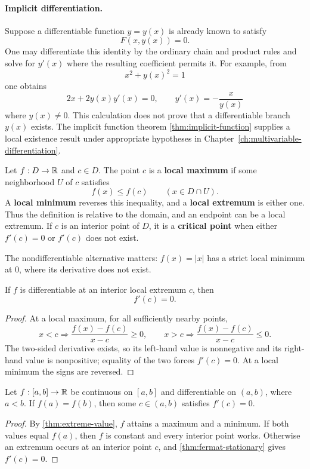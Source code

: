 \paragraph{Implicit differentiation.}
Suppose a differentiable function \(y=y(x)\) is already known to satisfy
\[
F(x,y(x))=0.
\]
One may differentiate this identity by the ordinary chain and product rules
and solve for \(y'(x)\) where the resulting coefficient permits it. For
example, from
\[
x^2+y(x)^2=1
\]
one obtains
\[
2x+2y(x)y'(x)=0,
\qquad
y'(x)=-\frac{x}{y(x)}
\]
where \(y(x)\ne0\). This calculation does not prove that a differentiable
branch \(y(x)\) exists. The implicit function theorem
\cref{thm:implicit-function} supplies a local existence result under
appropriate hypotheses in Chapter~\ref{ch:multivariable-differentiation}.

\begin{definition}
\label{def:local-extrema-critical}
Let \(f:D\to\mathbb{R}\) and \(c\in D\). The point \(c\) is a \textbf{local
maximum} if some neighborhood \(U\) of \(c\) satisfies
\[
f(x)\leq f(c)\qquad(x\in D\cap U).
\]
A \textbf{local minimum} reverses this inequality, and a
\textbf{local extremum} is either one. Thus the definition is relative to
the domain, and an endpoint can be a local extremum. If \(c\) is an interior
point of \(D\), it is a \textbf{critical point} when either \(f'(c)=0\) or
\(f'(c)\) does not exist.
\end{definition}
The nondifferentiable alternative matters: \(f(x)=|x|\) has a strict local
minimum at \(0\), where its derivative does not exist.

\begin{theorem}
\label{thm:fermat-stationary}
If \(f\) is differentiable at an interior local extremum \(c\), then
\[
f'(c)=0.
\]
\end{theorem}
\begin{proof}
At a local maximum, for all sufficiently nearby points,
\[
x<c\Longrightarrow \frac{f(x)-f(c)}{x-c}\geq0,
\qquad
x>c\Longrightarrow \frac{f(x)-f(c)}{x-c}\leq0.
\]
The two-sided derivative exists, so its left-hand value is nonnegative and
its right-hand value is nonpositive; equality of the two forces
$f'(c)=0$. At a local minimum the signs are reversed.
\end{proof}

\begin{theorem}
\label{thm:rolle}
Let $f:[a,b]\to\mathbb{R}$ be continuous on $[a,b]$ and differentiable on $(a,b)$, where $a<b$. If $f(a)=f(b)$, then some $c\in(a,b)$ satisfies $f'(c)=0$.
\end{theorem}
\begin{proof}
By \cref{thm:extreme-value}, $f$ attains a maximum and a minimum. If both
values equal $f(a)$, then $f$ is constant and every interior point works.
Otherwise an extremum occurs at an interior point \(c\), and
\cref{thm:fermat-stationary} gives \(f'(c)=0\).
\end{proof}

